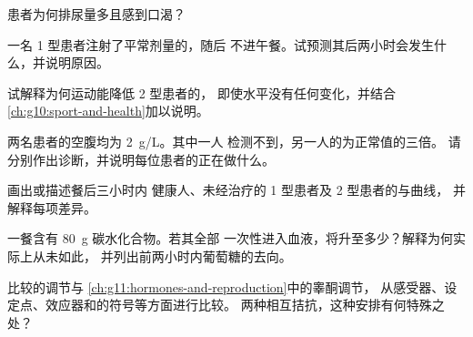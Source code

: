 \begin{exercise}[$\star\star$]\label{exo:g12:glucose-and-diabetes:9}
患者为何排尿量多且感到口渴？
\end{exercise}

\begin{exercise}[$\star\star$]\label{exo:g12:glucose-and-diabetes:10}
一名 1 型患者注射了平常剂量的，随后
不进午餐。试预测其后两小时会发生什么，并说明原因。
\end{exercise}

\begin{exercise}[$\star\star$]\label{exo:g12:glucose-and-diabetes:11}
试解释为何运动能降低 2 型患者的，
即使水平没有任何变化，并结合\cref{ch:g10:sport-and-health}加以说明。
\end{exercise}

\begin{exercise}[$\star\star\star$]\label{exo:g12:glucose-and-diabetes:12}
两名患者的空腹均为 \qty{2}{g/L}。其中一人
检测不到，另一人的为正常值的三倍。
请分别作出诊断，并说明每位患者的正在做什么。
\end{exercise}

\begin{exercise}[$\star\star\star$]\label{exo:g12:glucose-and-diabetes:13}
  画出或描述餐后三小时内
健康人、未经治疗的 1 型患者及 2 型患者的与曲线，
并解释每项差异。
\end{exercise}

\begin{exercise}[$\star\star\star$]\label{exo:g12:glucose-and-diabetes:14}
一餐含有 \qty{80}{g} 碳水化合物。若其全部
一次性进入血液，将升至多少？解释为何实际上从未如此，
并列出前两小时内葡萄糖的去向。
\end{exercise}

\begin{exercise}[$\star\star\star$]\label{exo:g12:glucose-and-diabetes:15}
比较的调节与
\cref{ch:g11:hormones-and-reproduction}中的睾酮调节，
从感受器、设定点、效应器和的符号等方面进行比较。
两种相互拮抗，这种安排有何特殊之处？
\end{exercise}

